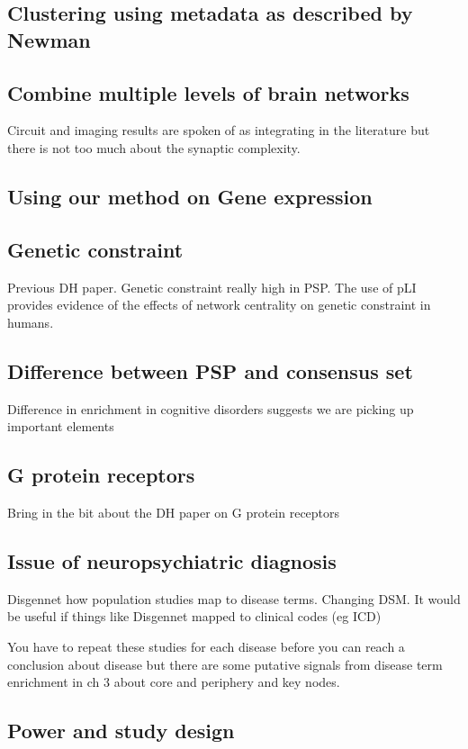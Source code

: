  \subsection{Clustering using metadata as described by Newman}
 \subsection{Combine multiple levels of brain networks}
 Circuit and imaging results are spoken of as integrating in the literature but there is not too much about the synaptic complexity. 
 \subsection{Using our method on Gene expression}
 \label{sec:discussion using our method on gene expression}
 \subsection{Genetic constraint}
 Previous DH paper. Genetic constraint really high in PSP. The use of pLI provides evidence of the effects of network centrality on genetic constraint in humans.
 
 \subsection{Difference between PSP and consensus set}
 Difference in enrichment in cognitive disorders suggests we are picking up important elements
 
 \subsection{G protein receptors}
 Bring in the bit about the DH paper on G protein receptors
 
 
 
 \subsection{Issue of neuropsychiatric diagnosis}
 Disgennet how population studies map to disease terms. Changing DSM. It would be useful if things like Disgennet mapped to clinical codes (eg ICD) 
 
 You have to repeat these studies for each disease before you can reach a conclusion about disease but there are some putative signals from disease term enrichment in ch 3 about core and periphery and key nodes. 
 
 \subsection{Power and study design}
 
